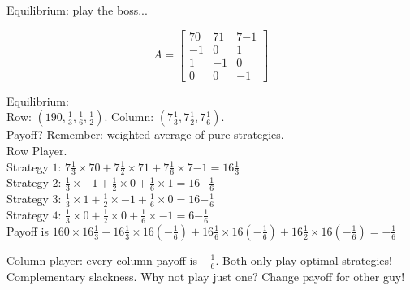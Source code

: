 \begin{frame}{Equilibrium: play the boss...}

{\small
\def\strat{7}
\def\payoff{16}
\def\optimal{19}

\[ A= \left[ \begin{array}{ccc}
{\strat}{0} & {\strat}{1} & {\strat}{-1}  \\
-1 & 0 &  1 \\
1 & -1 & 0  \\
0 & 0 & -1
\end{array} \right]\]


Equilibrium: \\ 
Row: $({\optimal}{0}, \frac{1}{3}, \frac{1}{6},\frac{1}{2}).$   %
Column: $({\strat}{\frac{1}{3}}, {\strat}{\frac{1}{2}},{\strat}{\frac{1}{6}}).$ \\ 
Payoff?  Remember: weighted average of pure strategies.  \\
Row Player. \\

Strategy $1$: ${\strat}{\frac{1}{3}} \times {\strat}{0} + {\strat}{\frac{1}{2}} \times {\strat}{1} + {\strat}{\frac{1}{6}} \times {\strat}{-1}  = {\payoff}{\frac{1}{3}}$ \\  %
Strategy $2$: $\frac{1}{3} \times -1 + \frac{1}{2} \times 0 + \frac{1}{6} \times 1  = {\payoff}{-\frac{1}{6}}$\\  %
Strategy $3$: $\frac{1}{3} \times 1 + \frac{1}{2} \times -1 + \frac{1}{6} \times 0  = {\payoff}{-\frac{1}{6}}$\\  %

Strategy $4$: $\frac{1}{3} \times 0 + \frac{1}{2} \times 0 + \frac{1}{6} \times -1  = {6}{-\frac{1}{6}}$\\  %

Payoff is ${\payoff}{0} \times {\payoff}{\frac{1}{3}} + {\payoff}{\frac{1}{3}} \times {\payoff}{(- \frac{1}{6})} + {\payoff}{\frac{1}{6}} \times {\payoff}{(-\frac{1}{6})} + {\payoff}{\frac{1}{2}}\times {\payoff}{(-\frac{1}{6})}  = -\frac{1}{6}$ 

Column player: every column payoff is $- \frac{1}{6}$.
Both only play optimal strategies!  {\color{blue} Complementary slackness.}
Why not play just one?  Change payoff for other guy!
}
\end{frame}

